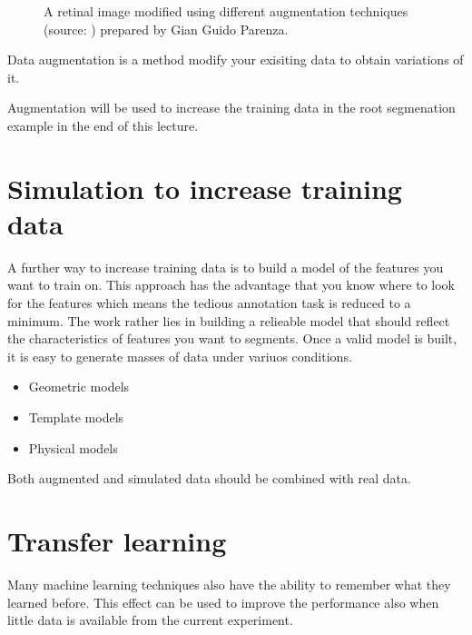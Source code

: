 \documentclass[letterpaper,10pt,english]{sphinxmanual}
\begin{document}
\begin{figure}[htbp]
\centering
\capstart

\noindent{}
\caption{A retinal image modified using different augmentation techniques (source: ) prepared by Gian Guido Parenza.}\label{\detokenize{ML4NeutronImageSegmentation:id13}}\end{figure}

Data augmentation is a method modify your exisiting data to obtain variations of it.



Augmentation will be used to increase the training data in the root segmenation example in the end of this lecture.


\section{Simulation to increase training data}
\label{\detokenize{ML4NeutronImageSegmentation:simulation-to-increase-training-data}}
A further way to increase training data is to build a model of the features you want to train on. This approach has the advantage that you know where to look for the features which means the tedious annotation task is reduced to a minimum. The work rather lies in building a relieable model that should reflect the characteristics of features you want to segments. Once a valid model is built, it is easy to generate masses of data under variuos conditions.
\begin{itemize}
\item {} 
Geometric models

\item {} 
Template models

\item {} 
Physical models

\end{itemize}

Both augmented and simulated data should be combined with real data.


\section{Transfer learning}
\label{\detokenize{ML4NeutronImageSegmentation:transfer-learning}}
Many machine learning techniques also have the ability to remember what they learned before. This effect can be used to improve the performance also when little data is available from the current experiment.
\end{document}
